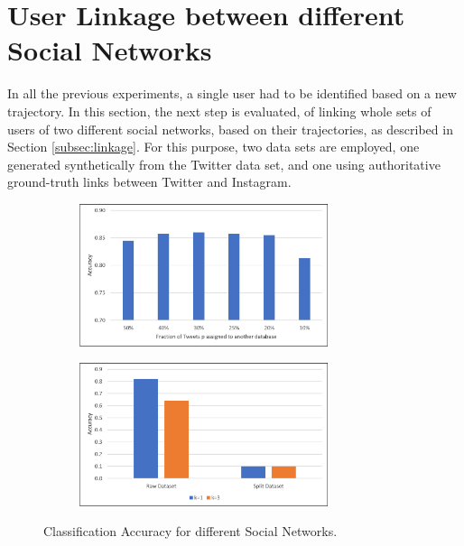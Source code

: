 
\chapter{User Linkage between different Social Networks}
\label{sec:linkage}

In all the previous experiments, a single user had to be identified based on a new trajectory. In this section, the next step is evaluated, of linking whole sets of users of two different social networks, based on their trajectories, as described in Section \ref{subsec:linkage}. For this purpose, two data sets are employed, one generated synthetically from the Twitter data set, and one using authoritative ground-truth links between Twitter and Instagram.

\begin{figure}[p]
	\centering
  \begin{subfigure}[b]{\textwidth}
    \centering
    \includegraphics[width = 0.8\textwidth]{figures/sample_accuracy}
    \label{fig:split_test}
  \end{subfigure}

  \begin{subfigure}[b]{\textwidth}
		\centering
    \includegraphics[width = 0.8\textwidth]{figures/split_accuracy}
    \label{fig:instagram}
  \end{subfigure}
  \caption{Classification Accuracy for different Social Networks.}
  \label{fig:split-results-ext}
	\figSpace
\end{figure}

